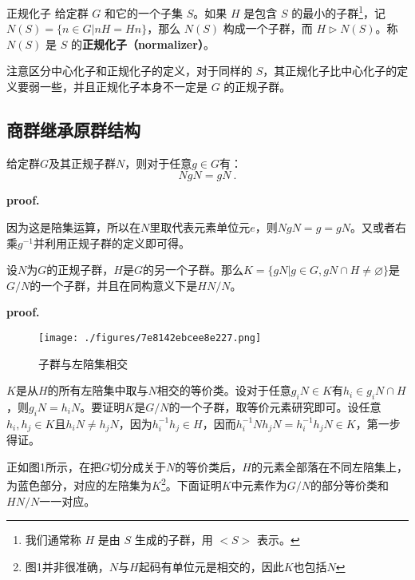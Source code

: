 \begin{definition}{正规化子}\label{def_NormSG_2}
给定群 $G$ 和它的一个子集 $S$。如果 $H$ 是包含 $S$ 的最小的子群\footnote{我们通常称 $H$ 是由 $S$ 生成的子群，用 $<S>$ 表示。}，记 $N(S)=\{n\in G|nH=Hn\}$，那么 $N(S)$ 构成一个子群，而 $H\vartriangleright N(S)$。称 $N(S)$ 是 $S$ 的\textbf{正规化子（normalizer）}。
\end{definition}

注意区分中心化子和正规化子的定义，对于同样的 $S$，其正规化子比中心化子的定义要弱一些，并且正规化子本身不一定是 $G$ 的正规子群。
\subsection{商群继承原群结构}
\begin{lemma}{}\label{lem_NormSG_1}
给定群$G$及其正规子群$N$，则对于任意$g\in G$有：
\begin{equation}
NgN=gN~.
\end{equation}
\end{lemma}
\textbf{proof.}

因为这是陪集运算，所以在$N$里取代表元素单位元$e$，则$NgN=g=gN$。又或者右乘$g^{-1}$并利用正规子群的定义即可得。
\begin{theorem}{}
设$N$为$G$的正规子群，$H$是$G$的另一个子群。那么$K=\{gN|g\in G,gN\cap H\neq \varnothing \}$是$G/N$的一个子群，并且在同构意义下是$HN/N$。
\end{theorem}
\textbf{proof.}
\begin{figure}[ht]
\centering
\texttt{[image: ./figures/7e8142ebcee8e227.png]}
\caption{子群与左陪集相交} \label{fig_NormSG_1}
\end{figure}
$K$是从$H$的所有左陪集中取与$N$相交的等价类。设对于任意$g_iN\in K$有$h_i\in g_iN\cap H$，则$g_iN=h_iN$。要证明$K$是$G/N$的一个子群，取等价元素研究即可。设任意$h_i,h_j\in K$且$h_iN\neq h_jN$，因为$h_i^{-1}h_j\in H$，因而$h_i^{-1}Nh_jN=h_i^{-1}h_jN\in K$，第一步得证。

正如图1所示，在把$G$切分成关于$N$的等价类后，$H$的元素全部落在不同左陪集上，为蓝色部分，对应的左陪集为$K$\footnote{图1并非很准确，$N$与$H$起码有单位元是相交的，因此$K$也包括$N$}。下面证明$K$中元素作为$G/N$的部分等价类和$HN/N$一一对应。

